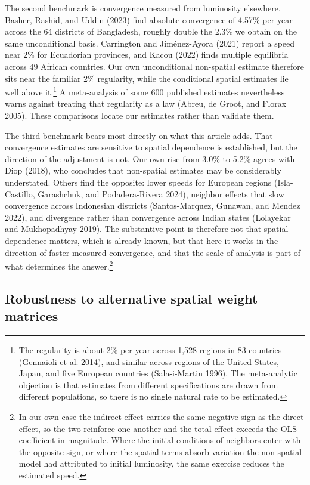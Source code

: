 \documentclass[
  letterpaper,
  DIV=11,
  numbers=noendperiod]{scrartcl}
\begin{document}
The second benchmark is convergence measured from luminosity elsewhere.
Basher, Rashid, and Uddin (2023) find absolute convergence of 4.57\% per
year across the 64 districts of Bangladesh, roughly double the 2.3\% we
obtain on the same unconditional basis. Carrington and Jiménez-Ayora
(2021) report a speed near 2\% for Ecuadorian provinces, and Kacou
(2022) finds multiple equilibria across 49 African countries. Our own
unconditional non-spatial estimate therefore sits near the familiar 2\%
regularity, while the conditional spatial estimates lie well above
it.\footnote{The regularity is about 2\% per year across 1,528 regions
  in 83 countries (Gennaioli et al. 2014), and similar across regions of
  the United States, Japan, and five European countries (Sala-i-Martin
  1996). The meta-analytic objection is that estimates from different
  specifications are drawn from different populations, so there is no
  single natural rate to be estimated.} A meta-analysis of some 600
published estimates nevertheless warns against treating that regularity
as a law (Abreu, de Groot, and Florax 2005). These comparisons locate
our estimates rather than validate them.

The third benchmark bears most directly on what this article adds. That
convergence estimates are sensitive to spatial dependence is
established, but the direction of the adjustment is not. Our own rise
from 3.0\% to 5.2\% agrees with Diop (2018), who concludes that
non-spatial estimates may be considerably understated. Others find the
opposite: lower speeds for European regions (Isla-Castillo, Garashchuk,
and Podadera-Rivera 2024), neighbor effects that slow convergence across
Indonesian districts (Santos-Marquez, Gunawan, and Mendez 2022), and
divergence rather than convergence across Indian states (Lolayekar and
Mukhopadhyay 2019). The substantive point is therefore not that spatial
dependence matters, which is already known, but that here it works in
the direction of faster measured convergence, and that the scale of
analysis is part of what determines the answer.\footnote{In our own case
  the indirect effect carries the same negative sign as the direct
  effect, so the two reinforce one another and the total effect exceeds
  the OLS coefficient in magnitude. Where the initial conditions of
  neighbors enter with the opposite sign, or where the spatial terms
  absorb variation the non-spatial model had attributed to initial
  luminosity, the same exercise reduces the estimated speed.}

\subsection{Robustness to alternative spatial weight
matrices}\label{robustness-to-alternative-spatial-weight-matrices}
\end{document}
